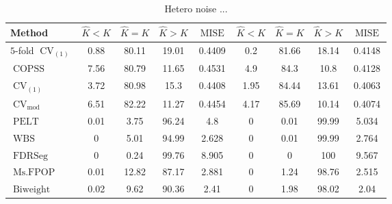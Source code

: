 \begin{table}[ht]
\centering
\begin{tabular}{|l|cccc|cccc|}
  \hline
Method & $\hat{K} < K$ & $\hat{K} = K$ & $\hat{K} > K$ & $\operatorname{MISE}$ & $\hat{K} < K$ & $\hat{K} = K$ & $\hat{K} > K$ & $\operatorname{MISE}$ \\ 
  \hline
$5$-fold $\operatorname{CV}_{(1)}$ &  0.88 & 80.11 & 19.01 & 0.4409 &   0.2 & 81.66 & 18.14 & 0.4148 \\ 
  $\operatorname{COPSS}$ &  7.56 & 80.79 & 11.65 & 0.4531 &   4.9 &  84.3 &  10.8 & 0.4128 \\ 
  $\operatorname{CV}_{(1)}$ &  3.72 & 80.98 &  15.3 & 0.4408 &  1.95 & 84.44 & 13.61 & 0.4063 \\ 
  $\operatorname{CV}_{\operatorname{mod}}$ &  6.51 & 82.22 & 11.27 & 0.4454 &  4.17 & 85.69 & 10.14 & 0.4074 \\ 
  $\operatorname{PELT}$ &  0.01 &  3.75 & 96.24 &   4.8 &     0 &  0.01 & 99.99 & 5.034 \\ 
  $\operatorname{WBS}$ &     0 &  5.01 & 94.99 & 2.628 &     0 &  0.01 & 99.99 & 2.764 \\ 
  $\operatorname{FDRSeg}$ &     0 &  0.24 & 99.76 & 8.905 &     0 &     0 &   100 & 9.567 \\ 
  $\operatorname{Ms.FPOP}$ &  0.01 & 12.82 & 87.17 & 2.881 &     0 &  1.24 & 98.76 & 2.515 \\ 
  $\operatorname{Biweight}$ &  0.02 &  9.62 & 90.36 &  2.41 &     0 &  1.98 & 98.02 &  2.04 \\ 
   \hline
\end{tabular}
\caption{Hetero noise ...} 
\end{table}
